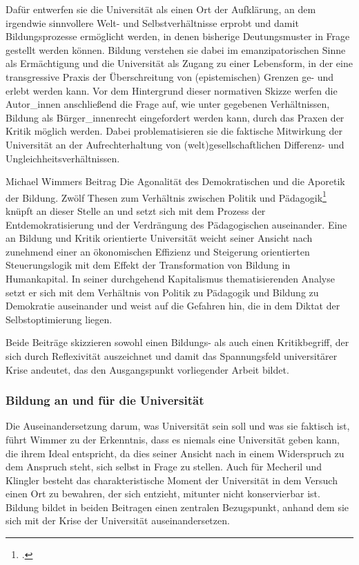 Dafür entwerfen sie die Universität als
einen Ort der Aufklärung, an dem \glqq irgendwie sinnvollere Welt- und
Selbstverhältnisse\grqq\footnotemark {} erprobt und damit Bildungsprozesse ermöglicht werden, in denen bisherige Deutungsmuster in Frage gestellt werden können. Bildung
verstehen sie dabei im emanzipatorischen Sinne als Ermächtigung und die
Universität als Zugang zu einer Lebensform, in der eine transgressive Praxis
der Überschreitung von (epistemischen) Grenzen ge- und erlebt werden kann. Vor
dem Hintergrund dieser normativen Skizze werfen die Autor\_innen anschließend
die Frage auf, wie unter gegebenen Verhältnissen, Bildung als Bürger\_innenrecht
eingefordert werden kann, durch das Praxen der Kritik möglich werden. Dabei
problematisieren sie die faktische Mitwirkung der Universität an der
Aufrechterhaltung von (welt)gesellschaftlichen Differenz- und
Ungleichheitsverhältnissen.

Michael Wimmers Beitrag \glqq Die Agonalität des
Demokratischen und die Aporetik der Bildung. Zwölf Thesen zum Verhältnis
zwischen Politik und Pädagogik\grqq\footnotemark \footcitetext{wimmer} knüpft
an dieser Stelle an und setzt sich mit dem Prozess der Entdemokratisierung und
der Verdrängung des Pädagogischen\footnotemark {} auseinander. Eine an Bildung und Kritik
orientierte Universität weicht seiner Ansicht nach zunehmend \glqq einer an
ökonomischen Effizienz und Steigerung orientierten Steuerungslogik\grqq\footnotemark {} mit dem
Effekt der Transformation von Bildung in Humankapital. In seiner durchgehend
Kapitalismus thematisierenden Analyse setzt er sich mit dem Verhältnis von
Politik zu Pädagogik und Bildung zu Demokratie auseinander und weist auf die
Gefahren hin, die in dem Diktat der Selbstoptimierung liegen.

Beide Beiträge skizzieren sowohl einen Bildungs- als auch einen Kritikbegriff, der sich durch
Reflexivität auszeichnet und damit das Spannungsfeld universitärer Krise
andeutet, das den Ausgangspunkt vorliegender Arbeit bildet. 

\subsubsection{Bildung an und für die Universität}

Die Auseinandersetzung darum, was Universität sein soll und was sie faktisch
ist, führt Wimmer zu der Erkenntnis, dass es niemals eine Universität geben
kann, die ihrem Ideal entspricht, da dies seiner Ansicht nach in einem
Widerspruch zu dem Anspruch steht, sich selbst in Frage zu
stellen.\footnotemark {} Auch für
Mecheril und Klingler besteht das charakteristische Moment der Universität in
dem Versuch einen Ort zu bewahren, \glqq der sich entzieht, mitunter nicht
konservierbar ist.\grqq\footnotemark {} Bildung bildet in beiden Beitragen einen zentralen
Bezugspunkt, anhand dem sie sich mit der Krise der Universität
auseinandersetzen.
\\

